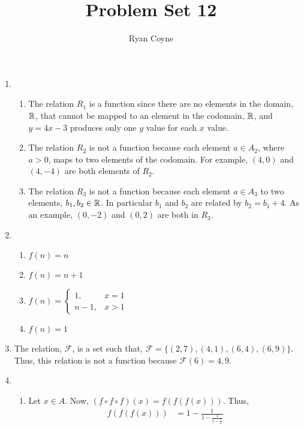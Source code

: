 \documentclass[12pt]{article}
\newcommand{\mc}[1]{\mathcal{#1}}
\begin{document}
\title{Problem Set 12}
\author{Ryan Coyne}
\date{}
\maketitle

\begin{enumerate}
    \item \begin{enumerate}
        \item The relation \(R_1\) is a function since there are no elements in the domain, \(\mathbb{R}\), that cannot be mapped to an element in the codomain, \(\mathbb{R}\), and \(y=4x-3\) produces only one \(y\) value for each \(x\) value.
        \item The relation \(R_2\) is not a function because each element \(a\in A_2\), where \(a>0\), maps to two elements of the codomain. For example, \((4,0)\) and \((4,-4)\) are both elements of \(R_2\).
        \item The relation \(R_3\) is not a function because each element \(a\in A_3\) to two elements, \(b_1, b_2 \in \mathbb{R}\). In particular \(b_1\) and \(b_2\) are related by \(b_2 = b_1 + 4\). As an example, \((0,-2)\) and \((0,2)\) are both in \(R_3\).
    \end{enumerate}
    \item \begin{enumerate}
        \item \(f(n) = n\)
        \item \(f(n) = n + 1\)
        \item \(f(n) = \begin{cases}
            1 ,& x = 1\\
            n-1, & x > 1
        \end{cases}\)
        \item \(f(n) = 1\)
    \end{enumerate}
    \item The relation, \(\mc F\), is a set such that, \(\mc F = \{(2,7), (4,1), (6, 4), (6, 9)\}\). Thus, this relation is not a function because \(\mc F(6) = 4, 9\).
    \item \begin{enumerate}
        \item Let \(x\in A\). Now, \((f\circ f\circ f)(x) = f(f(f(x)))\). Thus, \begin{equation*}
            \begin{split}
                f(f(f(x))) &= 1 - \frac{1}{1 - \frac{1}{1 - \frac{1}{x}}}\\

\end{split}
\end{equation*}
\end{enumerate}
\end{enumerate}
\end{document}
